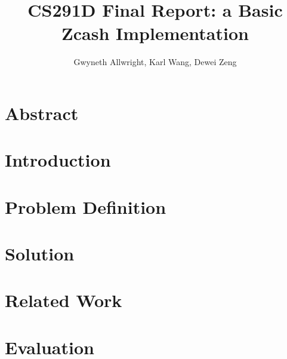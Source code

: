\documentclass{article}
\begin{document}
\title{CS291D Final Report: a Basic Zcash Implementation}
\author{Gwyneth Allwright, Karl Wang, Dewei Zeng}

\maketitle

\section*{Abstract}

\tableofcontents

\newpage

\section{Introduction}
\section{Problem Definition}
\section{Solution}
\section{Related Work}
\section{Evaluation}
\end{document}
